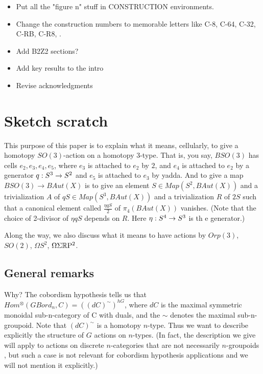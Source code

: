 \documentclass{amsart}
\begin{document}
\begin{itemize}
\item Put all the "figure n" stuff in CONSTRUCTION environments.
\item Change the construction numbers to memorable letters like C-8, C-64, C-32, C-RB, C-R8, .
\item Add B2Z2 sections?
\item Add key results to the intro
\item Revise acknowledgments
\end{itemize}

\section*{Sketch scratch}

This purpose of this paper is to explain what it means, cellularly, to give a homotopy $SO(3)$-action on a homotopy 3-type.  That is, you say, $BSO(3)$ has cells $e_2, e_3, e_4, e_5$, where $e_3$ is attached to $e_2$ by $2$, and $e_4$ is attached to $e_2$ by a generator $q: S^3 \rightarrow S^2$ and $e_5$ is attached to $e_3$ by yadda.  And to give a map $BSO(3) \rightarrow BAut(X)$ is to give an element $S \in Map(S^2,BAut(X))$ and a trivialization $A$ of $q S \in Map(S^3,BAut(X))$ and a trivialization $R$ of $2S$ such that a canonical element called $\frac{\eta q S}{2}$ of $\pi_4(BAut(X))$ vanishes.  (Note that the choice of 2-divisor of $\eta q S$ depends on $R$.  Here $\eta: S^4 \rightarrow S^3$ is th 	e generator.)

Along the way, we also discuss what it means to have actions by $Orp(3)$, $SO(2)$, $\Omega S^2$, $\Omega \Sigma \mathbb R \mathrm{P}^2$.


\subsection{General remarks}

Why? The cobordism hypothesis tells us that $Hom^{\otimes}(GBord_n,C) = ((dC)^{\sim})^{hG}$, where $dC$ is the maximal symmetric monoidal sub-n-category of C with duals, and the $\sim$ denotes the maximal sub-n-groupoid.  Note that $(dC)^\sim$ is a homotopy $n$-type.  Thus we want to describe explicitly the structure of $G$ actions on $n$-types.  (In fact, the description we give will apply to actions on discrete $n$-categories that are not necessarily $n$-groupoids , but such a case is not relevant for cobordism hypothesis applications and we will not mention it explicitly.)
\end{document}
